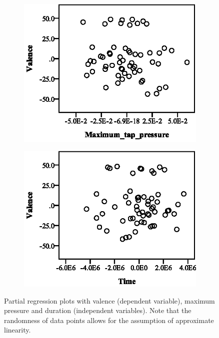\begin{figure}[ht]
  \centering
  \begin{subfigure}[b]{0.45\textwidth}
    \centering
    \includegraphics[width=\textwidth]{images/linearity/partialregression/valence/ValMaxMax.eps}
    \label{fig:valmaxmax}
  \end{subfigure}
  \quad
  \begin{subfigure}[b]{0.45\textwidth}
    \centering
    \includegraphics[width=\textwidth]{images/linearity/partialregression/valence/ValMaxTime.eps}
    \label{fig:valmaxtime}
  \end{subfigure}
  \caption{Partial regression plots with valence (dependent variable), maximum pressure and duration (independent variables). Note that the randomness of data points allows for the assumption of approximate linearity.}
\end{figure}

